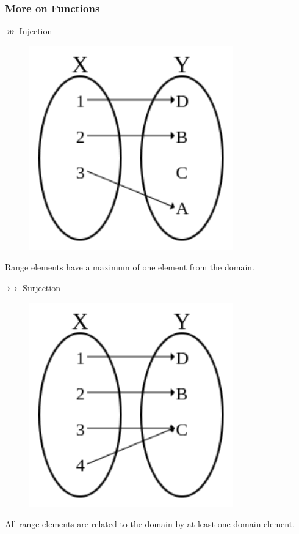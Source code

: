 \documentclass{beamer}
\begin{document}
\begin{frame}
\frametitle{More on Functions}

\begin{minipage}[t]{0.45\textwidth}
\begin{center}
$\pinj$ Injection
\begin{figure}
	\includegraphics[scale=0.5]{Injection}
\end{figure}
Range elements have a maximum
of one element from the domain.
\end{center}
\end{minipage}
\begin{minipage}[t]{0.5\textwidth}
\begin{center}
$\tinj$ Surjection
\begin{figure}
	\includegraphics[scale=0.45]{Surjection}
\end{figure}
All range elements are related to the domain by at least one domain element.
\end{center}
\end{minipage}

\end{frame}
\end{document}

